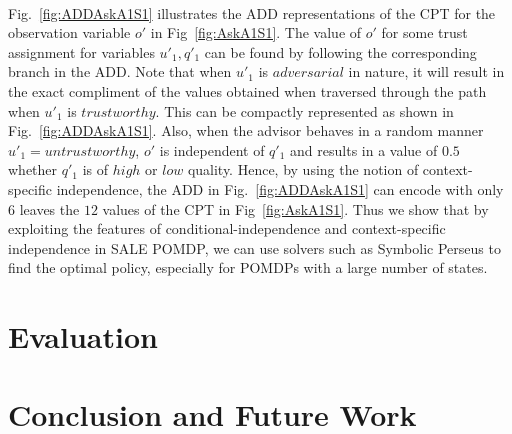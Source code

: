 \documentclass{aamas2013}
\providecommand{\SALEP}{SALE POMDP}
\begin{document}
\\ Fig.~\ref{fig:ADDAskA1S1} illustrates the ADD representations of the CPT for the observation variable $o'$ in Fig~\ref{fig:AskA1S1}. The value of $o'$ for some trust assignment for variables $u'_1, q'_1$ can be found by following the corresponding branch in the ADD.  Note that when $u'_1$ is $adversarial$ in nature, it will result in the exact compliment of the values obtained when traversed through the path when $u'_1$ is $trustworthy$. This can be compactly represented as shown in Fig.~\ref{fig:ADDAskA1S1}. Also, when the advisor behaves in a random manner $u'_1 = untrustworthy$, $o'$ is independent of $q'_1$  and results in a value of $0.5$ whether $q'_1$ is of $high$ or $low$ quality. Hence, by using the notion of context-specific independence, the ADD in Fig.~\ref{fig:ADDAskA1S1} can encode with only $6$ leaves the $12$ values of the CPT in Fig~\ref{fig:AskA1S1}.  Thus we show that by exploiting the features of conditional-independence and context-specific independence in \SALEP{}, we can use solvers such as Symbolic Perseus to find the optimal policy, especially for POMDPs with a large number of states.


\section{Evaluation}\label{sec:5}
\section{Conclusion and Future Work}\label{sec:6}



\end{document}
